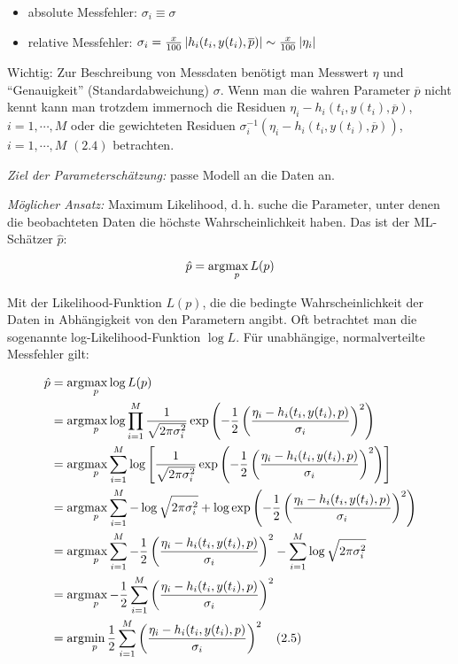 \begin{itemize}
\item absolute Messfehler: $\sigma_i \equiv \sigma$
\item relative Messfehler: $\sigma_i =  \frac x{100} \left| h_i(t_i,y(t_i),\overline p) \right| \sim \frac x{100} \left|\eta_i\right|$
\end{itemize}

Wichtig: Zur Beschreibung von Messdaten benötigt man Messwert $\eta$ und "`Genauigkeit"' (Standardabweichung) $\sigma$. Wenn man die wahren Parameter $\overline p$ nicht kennt kann man trotzdem immernoch die Residuen $\eta_i-h_i(t_i,y(t_i), \overline p)$, $i=1,\cdots,M$ oder die gewichteten Residuen $\sigma_i^{-1}(\eta_i-h_i(t_i,y(t_i), \overline p))$, $i=1,\cdots,M$ $(2.4)$  betrachten.

\emph{Ziel der Parameterschätzung:} passe Modell an die Daten an.

\emph{Möglicher Ansatz:} Maximum Likelihood, d.\,h. suche die Parameter, unter denen die beobachteten Daten die höchste Wahrscheinlichkeit haben. Das ist der ML-Schätzer $\hat p$:

\[\hat p = \arg\!\max_p L(p)\]

Mit der Likelihood-Funktion $L(p)$, die die bedingte Wahrscheinlichkeit der Daten in Abhängigkeit von den Parametern angibt. Oft betrachtet man die sogenannte log-Likelihood-Funktion $\log L$. Für unabhängige, normalverteilte Messfehler gilt:

\begin{align*}
\hat p &= \arg\!\max_p \log L(p)\\
&= \arg\!\max_p \log \prod_{i=1}^M \frac 1{\sqrt{2\pi \sigma_i^2}} \exp\left( -\frac 12 \left(\frac{\eta_i-h_i(t_i,y(t_i),p)}{\sigma_i} \right)^2 \right) \\
&= \arg\!\max_p \sum_{i=1}^M \log \left[\frac 1{\sqrt{2\pi \sigma_i^2}} \exp\left( -\frac 12 \left(\frac{\eta_i-h_i(t_i,y(t_i),p)}{\sigma_i} \right)^2 \right)\right] \\
&= \arg\!\max_p \sum_{i=1}^M -\log \sqrt{2\pi \sigma_i^2} + \log \exp\left( -\frac 12 \left(\frac{\eta_i-h_i(t_i,y(t_i),p)}{\sigma_i} \right)^2 \right) \\
&= \arg\!\max_p \sum_{i=1}^M -\frac 12 \left(\frac{\eta_i-h_i(t_i,y(t_i),p)}{\sigma_i} \right)^2 - \sum_{i=1}^M \log \sqrt{2\pi \sigma_i^2} \\
&= \arg\!\max_p - \frac 12 \sum_{i=1}^M \left(\frac{\eta_i-h_i(t_i,y(t_i),p)}{\sigma_i} \right)^2 \\
&= \arg\!\min_p \frac 12 \sum_{i=1}^M \left(\frac{\eta_i-h_i(t_i,y(t_i),p)}{\sigma_i} \right)^2 \quad (2.5)\\
\end{align*}

